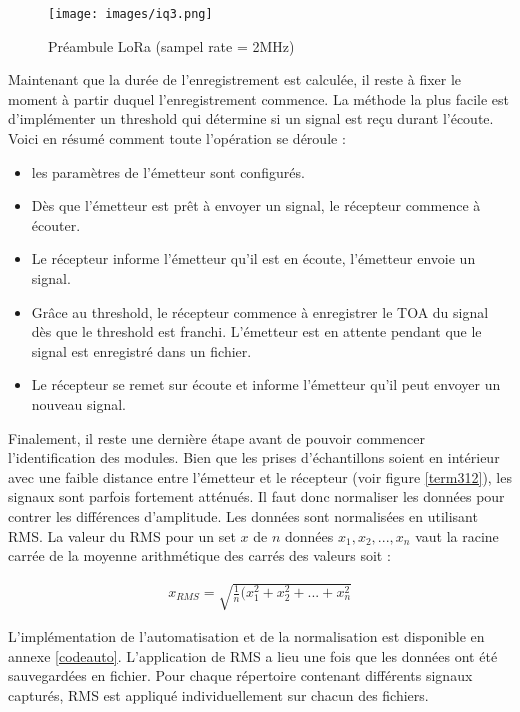 \clearpage

\begin{figure}[h]
\centering

\texttt{[image: images/iq3.png]}
\caption{Préambule LoRa (sampel rate = 2MHz)}\label{term311}
\end{figure}

Maintenant que la durée de l'enregistrement est calculée, il reste à fixer le moment à partir duquel l'enregistrement commence. La méthode la plus facile est d'implémenter un threshold qui détermine si un signal est reçu durant l'écoute. Voici en résumé comment toute l'opération se déroule :

\begin{itemize}
\item les paramètres de l'émetteur sont configurés. 
\item Dès que l'émetteur est prêt à envoyer un signal, le récepteur commence à écouter.
\item Le récepteur informe l'émetteur qu'il est en écoute, l'émetteur envoie un signal.
\item Grâce au threshold, le récepteur commence à enregistrer le \ac{TOA} du signal dès que le threshold est franchi. L'émetteur est en attente pendant que le signal est enregistré dans un fichier.
\item Le récepteur se remet sur écoute et informe l'émetteur qu'il peut envoyer un nouveau signal.
\end{itemize}

Finalement, il reste une dernière étape avant de pouvoir commencer l'identification des modules. Bien que les prises d'échantillons soient en intérieur avec une faible distance entre l'émetteur et le récepteur (voir figure \ref{term312}), les signaux sont parfois fortement atténués. Il faut donc normaliser les données pour contrer les différences d'amplitude. Les données sont normalisées en utilisant \ac{RMS}. La valeur du \ac{RMS} pour un set $x$ de $n$ données ${x_1,x_2,...,x_n}$ vaut la racine carrée de la moyenne arithmétique des carrés des valeurs soit :

\begin{align}
    x_{RMS} = \sqrt{\frac{1}{n}(x_1^2 + x_2^2 + ... + x_n^2}
\end{align}

L'implémentation de l'automatisation et de la normalisation est disponible en annexe \ref{codeauto}. L'application de \ac{RMS} a lieu une fois que les données ont été sauvegardées en fichier. Pour chaque répertoire contenant différents signaux capturés, \ac{RMS} est appliqué individuellement sur chacun des fichiers.

